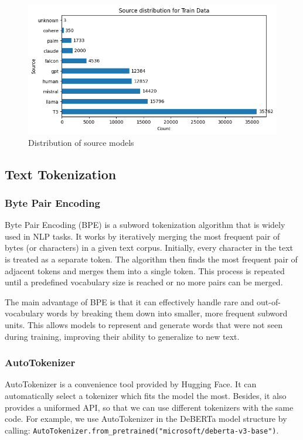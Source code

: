 \documentclass[conference]{IEEEtran}
\begin{document}
\begin{figure}[htbp]
  \centerline{\includegraphics[width=\columnwidth]{figs/source_dist.png}}
  \caption{Distribution of source models}
  \label{fig:source_dist}
\end{figure}

\subsection{Text Tokenization}

\subsubsection{Byte Pair Encoding}

Byte Pair Encoding (BPE) is a subword tokenization algorithm that is widely used in NLP tasks. It works by iteratively merging the most frequent pair of bytes (or characters) in a given text corpus. Initially, every character in the text is treated as a separate token. The algorithm then finds the most frequent pair of adjacent tokens and merges them into a single token. This process is repeated until a predefined vocabulary size is reached or no more pairs can be merged.

The main advantage of BPE is that it can effectively handle rare and out-of-vocabulary words by breaking them down into smaller, more frequent subword units. This allows models to represent and generate words that were not seen during training, improving their ability to generalize to new text.

\subsubsection{AutoTokenizer}

AutoTokenizer is a convenience tool provided by Hugging Face. It can automatically select a tokenizer which fits the model the most. Besides, it also provides a uniformed API, so that we can use different tokenizers with the same code. For example, we use AutoTokenizer in the DeBERTa model structure by calling: \texttt{AutoTokenizer.from\linebreak\_pretrained("microsoft/deberta-v3-base")}.
\end{document}
